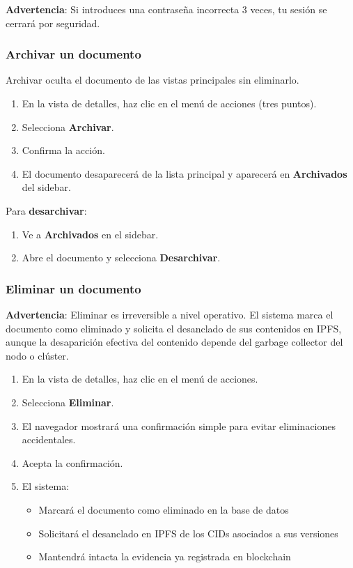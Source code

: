 \documentclass[11pt, a4paper]{article}
\begin{document}
\textbf{Advertencia}: Si introduces una contraseña incorrecta 3 veces, tu sesión se cerrará por seguridad.

\subsubsection{Archivar un documento}

Archivar oculta el documento de las vistas principales sin eliminarlo.

\begin{enumerate}
    \item En la vista de detalles, haz clic en el menú de acciones (tres puntos).
    \item Selecciona \textbf{Archivar}.
    \item Confirma la acción.
    \item El documento desaparecerá de la lista principal y aparecerá en \textbf{Archivados} del sidebar.
\end{enumerate}

Para \textbf{desarchivar}:
\begin{enumerate}
    \item Ve a \textbf{Archivados} en el sidebar.
    \item Abre el documento y selecciona \textbf{Desarchivar}.
\end{enumerate}

\subsubsection{Eliminar un documento}

\textbf{Advertencia}: Eliminar es irreversible a nivel operativo. El sistema marca el documento como eliminado y solicita el desanclado de sus contenidos en IPFS, aunque la desaparición efectiva del contenido depende del garbage collector del nodo o clúster.

\begin{enumerate}
    \item En la vista de detalles, haz clic en el menú de acciones.
    \item Selecciona \textbf{Eliminar}.
    \item El navegador mostrará una confirmación simple para evitar eliminaciones accidentales.
    \item Acepta la confirmación.
    \item El sistema:
    \begin{itemize}
        \item Marcará el documento como eliminado en la base de datos
        \item Solicitará el desanclado en IPFS de los CIDs asociados a sus versiones
        \item Mantendrá intacta la evidencia ya registrada en blockchain
    \end{itemize}
\end{enumerate}
\end{document}
